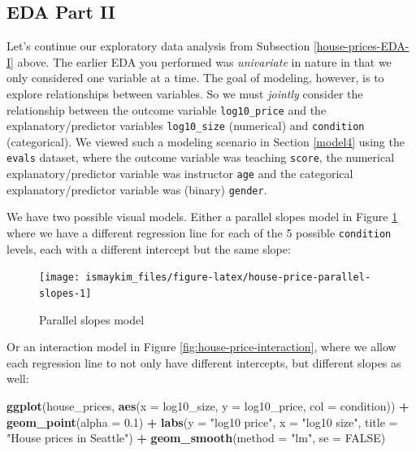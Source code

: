 \documentclass[12pt, krantz2,]{krantz}
\makeatletter
\newenvironment{Shaded}{\begin{snugshade}}{\end{snugshade}}
\newcommand{\DataTypeTok}[1]{\textcolor[rgb]{0.27,0.27,0.27}{#1}}
\newcommand{\FloatTok}[1]{\textcolor[rgb]{0.06,0.06,0.06}{#1}}
\newcommand{\KeywordTok}[1]{\textcolor[rgb]{0.27,0.27,0.27}{\textbf{#1}}}
\newcommand{\NormalTok}[1]{#1}
\newcommand{\OperatorTok}[1]{\textcolor[rgb]{0.43,0.43,0.43}{\textbf{#1}}}
\newcommand{\OtherTok}[1]{\textcolor[rgb]{0.37,0.37,0.37}{#1}}
\newcommand{\StringTok}[1]{\textcolor[rgb]{0.5,0.5,0.5}{#1}}
\newenvironment{kframe}{%
\medskip{}
\setlength{\fboxsep}{.8em}
 \def\at@end@of@kframe{}%
 \ifinner\ifhmode%
  \def\at@end@of@kframe{\end{minipage}}%
  \begin{minipage}{\columnwidth}%
 \fi\fi%
 \def\FrameCommand##1{\hskip\@totalleftmargin \hskip-\fboxsep
 \colorbox{shadecolor}{##1}\hskip-\fboxsep
     \hskip-\linewidth \hskip-\@totalleftmargin \hskip\columnwidth}%
 \MakeFramed {\advance\hsize-\width
   \@totalleftmargin\z@ \linewidth\hsize
   \@setminipage}}%
 {\par\unskip\endMakeFramed%
 \at@end@of@kframe}
\renewenvironment{Shaded}{\begin{kframe}}{\end{kframe}}
\makeatother
\begin{document}
\hypertarget{eda-part-ii}{%
\subsection{EDA Part II}\label{eda-part-ii}}

Let's continue our exploratory data analysis from Subsection \ref{house-prices-EDA-I} above. The earlier EDA you performed was \emph{univariate} in nature in that we only considered one variable at a time. The goal of modeling, however, is to explore relationships between variables. So we must \emph{jointly} consider the relationship between the outcome variable \texttt{log10\_price} and the explanatory/predictor variables \texttt{log10\_size} (numerical) and \texttt{condition} (categorical). We viewed such a modeling scenario in Section \ref{model4} using the \texttt{evals} dataset, where the outcome variable was teaching \texttt{score}, the numerical explanatory/predictor variable was instructor \texttt{age} and the categorical explanatory/predictor variable was (binary) \texttt{gender}.

We have two possible visual models. Either a parallel slopes model in Figure \ref{fig:house-price-parallel-slopes} where we have a different regression line for each of the 5 possible \texttt{condition} levels, each with a different intercept but the same slope:

\begin{figure}

{\centering \texttt{[image: ismaykim\_files/figure-latex/house-price-parallel-slopes-1]} 

}

\caption{Parallel slopes model}\label{fig:house-price-parallel-slopes}
\end{figure}

Or an interaction model in Figure \ref{fig:house-price-interaction}, where we allow each regression line to not only have different intercepts, but different slopes as well:

\begin{Shaded}
\begin{Highlighting}[]
\KeywordTok{ggplot}\NormalTok{(house_prices, }\KeywordTok{aes}\NormalTok{(}\DataTypeTok{x =}\NormalTok{ log10_size, }\DataTypeTok{y =}\NormalTok{ log10_price, }\DataTypeTok{col =}\NormalTok{ condition)) }\OperatorTok{+}
\StringTok{  }\KeywordTok{geom_point}\NormalTok{(}\DataTypeTok{alpha =} \FloatTok{0.1}\NormalTok{) }\OperatorTok{+}
\StringTok{  }\KeywordTok{labs}\NormalTok{(}\DataTypeTok{y =} \StringTok{"log10 price"}\NormalTok{, }\DataTypeTok{x =} \StringTok{"log10 size"}\NormalTok{, }\DataTypeTok{title =} \StringTok{"House prices in Seattle"}\NormalTok{) }\OperatorTok{+}
\StringTok{  }\KeywordTok{geom_smooth}\NormalTok{(}\DataTypeTok{method =} \StringTok{"lm"}\NormalTok{, }\DataTypeTok{se =} \OtherTok{FALSE}\NormalTok{)}
\end{Highlighting}
\end{Shaded}
\end{document}
